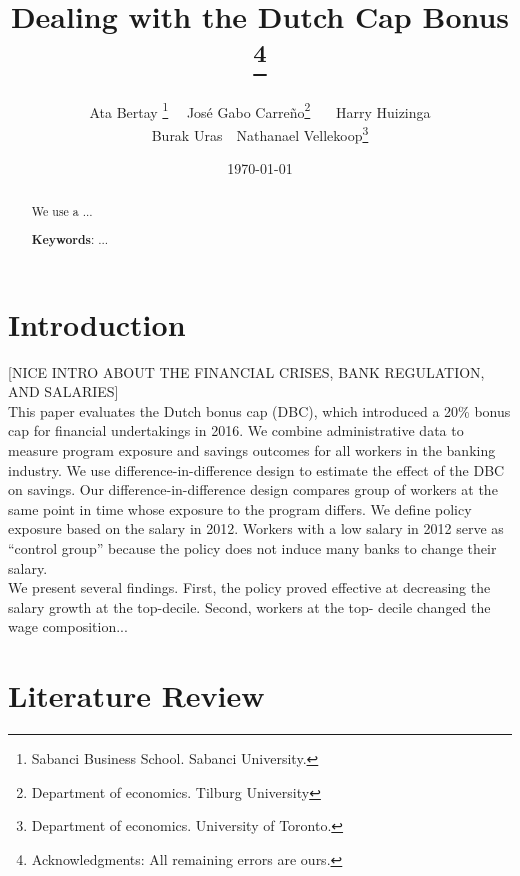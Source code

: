 \documentclass[12pt]{article}
\title{Dealing with the Dutch Cap Bonus \thanks{Acknowledgments: All remaining errors are ours.}}
\author{Ata Bertay \thanks{%
		Sabanci Business School. Sabanci University.}   \ \   José Gabo Carreño\thanks{%
		Department of economics. Tilburg University} \ \ \ Harry Huizinga\footnotemark[3] \\  Burak Uras\footnotemark[3] \ \ Nathanael Vellekoop\thanks{Department of economics. University of Toronto.} }
\date{\today}
\begin{document}
\maketitle

\begin{abstract}

We use a ...

\textbf{Keywords}: ...

\end{abstract}
\vspace{1cm}


\newpage

\section{Introduction}

[NICE INTRO ABOUT THE FINANCIAL CRISES, BANK REGULATION, AND SALARIES] \\

This paper evaluates the Dutch bonus cap (DBC), which introduced a 20\% bonus cap for financial undertakings in 2016. We combine administrative data to measure program exposure and savings outcomes for all workers in the banking industry. We use difference-in-difference 
design to estimate the effect of the DBC on savings. Our difference-in-difference design compares group of workers at the same point in time whose exposure to the program differs. We define policy exposure based on the salary in 2012. Workers with a low salary in 2012 serve as ``control group'' because the policy does not induce many banks to change their salary. \\

We present several findings. First, the policy proved effective at decreasing the salary growth at the top-decile. Second, workers at the top- decile changed the wage composition...


\newpage
\section{Literature Review} \label{literature_review}
\end{document}
